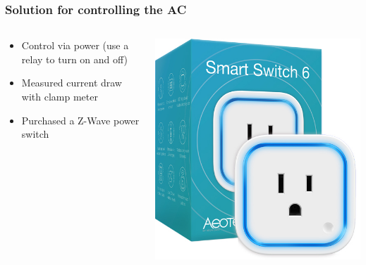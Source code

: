 \documentclass[aspectratio=169,11pt,hyperref={colorlinks=true}]{beamer}
\begin{document}
\begin{frame}
    \frametitle{Solution for controlling the AC}
    \begin{columns}
        \begin{column}{.48\textwidth}
            \begin{itemize}
                \item Control via power (use a relay to turn on and off)
                \item Measured current draw with clamp meter
                \item Purchased a Z-Wave power switch
            \end{itemize}
        \end{column}
        \begin{column}{.48\textwidth}
            \includegraphics[width=.8\textwidth]{aeotec-ss6.jpg}
        \end{column}
    \end{columns}
\end{frame}
\end{document}
